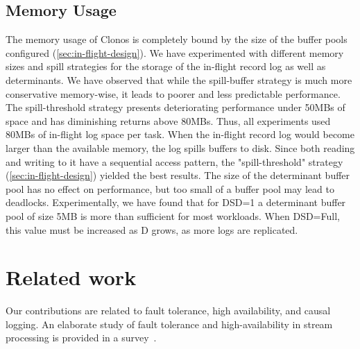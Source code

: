 \documentclass[sigconf]{acmart}
\begin{document}
\vspace{-5mm}
\subsection{Memory Usage}
The memory usage of Clonos is completely bound by the size of the buffer pools configured (\autoref{sec:in-flight-design}).
We have experimented with different memory sizes and spill strategies for the storage of the in-flight record log as well as determinants. 
We have observed that while the spill-buffer strategy is much more conservative memory-wise, it leads to poorer and less predictable performance. The spill-threshold strategy presents deteriorating performance under 50MBs of space and has diminishing returns above 80MBs.
Thus, all experiments used 80MBs of in-flight log space per task.
When the in-flight record log would become larger than the available memory, the log spills buffers to disk.
Since both reading and writing to it have a sequential access pattern, the "spill-threshold" strategy (\autoref{sec:in-flight-design}) yielded the best results.
The size of the determinant buffer pool has no effect on performance, but too small of a buffer pool may lead to deadlocks. 
Experimentally, we have found that for DSD=1 a determinant buffer pool of size 5MB is more than sufficient for most workloads. When DSD=Full, this value must be increased as D grows, as more logs are replicated.





\section{Related work}
\label{sec:related-work}

Our contributions are related to fault tolerance, high availability, and causal logging.
An elaborate study of fault tolerance and high-availability in stream processing is provided in a survey~\cite{fragkoulis2020survey}.
\end{document}
